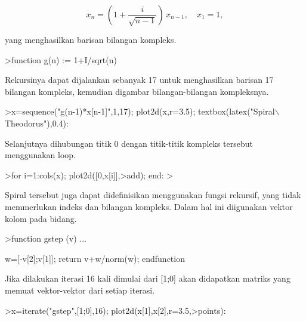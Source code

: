 \documentclass[a4paper,10pt]{article}
\begin{document}
\begin{eulernotebook}
\begin{eulercomment}
\begin{eulercomment}
\begin{eulercomment}
\begin{eulercomment}
\begin{eulercomment}
\end{eulercomment}
\begin{eulerformula}
\[
x_n = \left( 1 + \frac{i}{\sqrt{n-1}} \right) \, x_{n-1}, \quad x_1=1,
\]
\end{eulerformula}
\begin{eulercomment}
yang menghasilkan barisan bilangan kompleks.
\end{eulercomment}
\begin{eulerprompt}
>function g(n) := 1+I/sqrt(n)
\end{eulerprompt}
\begin{eulercomment}
Rekursinya dapat dijalankan sebanyak 17 untuk menghasilkan barisan 17 bilangan kompleks,
kemudian digambar bilangan-bilangan kompleksnya.
\end{eulercomment}
\begin{eulerprompt}
>x=sequence("g(n-1)*x[n-1]",1,17); plot2d(x,r=3.5); textbox(latex("Spiral\(\backslash\) Theodorus"),0.4):
\end{eulerprompt}
\begin{eulercomment}
Selanjutnya dihubungan titik 0 dengan titik-titik kompleks tersebut menggunakan loop.
\end{eulercomment}
\begin{eulerprompt}
>for i=1:cols(x); plot2d([0,x[i]],>add); end:
> 
\end{eulerprompt}
\begin{eulercomment}
Spiral tersebut juga dapat didefinisikan menggunakan fungsi rekursif, yang tidak memmerlukan
indeks dan bilangan kompleks. Dalam hal ini diigunakan vektor kolom pada bidang.
\end{eulercomment}
\begin{eulerprompt}
>function gstep (v) ...
\end{eulerprompt}
\begin{eulerudf}
  w=[-v[2];v[1]];
  return v+w/norm(w);
  endfunction
\end{eulerudf}
\begin{eulercomment}
Jika dilakukan iterasi 16 kali dimulai dari [1;0] akan didapatkan matriks yang memuat
vektor-vektor dari setiap iterasi.
\end{eulercomment}
\begin{eulerprompt}
>x=iterate("gstep",[1;0],16); plot2d(x[1],x[2],r=3.5,>points):
\end{eulerprompt}
\begin{eulercomment}
\begin{eulercomment}
\begin{eulercomment}

\end{eulercomment}
\end{eulercomment}
\end{eulercomment}
\end{eulercomment}
\end{eulercomment}
\end{eulercomment}
\end{eulercomment}
\end{eulernotebook}
\end{document}
